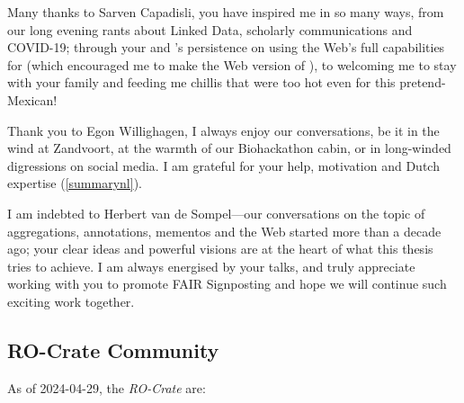 Many thanks to Sarven Capadisli, you have inspired me in so many ways, from our long evening rants about Linked Data, scholarly communications and COVID-19; through your and 's persistence on using the Web's full capabilities for   (which encouraged me to make the Web version of ), to welcoming me to stay with your family and feeding me chillis that were too hot even for this pretend-Mexican!

Thank you to Egon Willighagen, I always enjoy our conversations, be it in the wind at Zandvoort, at the warmth of our Biohackathon cabin, or in long-winded digressions on social media. I am grateful for your help, motivation and Dutch expertise (\vref{summarynl}).

I am indebted to Herbert van de Sompel---our conversations on the topic of aggregations, annotations, mementos and the Web started more than a decade ago; your clear ideas and powerful visions are at the heart of what this thesis tries to achieve. I am always energised by your talks, and truly appreciate working with you to promote FAIR Signposting and hope we will continue such exciting work together.


\subsection{RO-Crate Community}\label{communitylist}
\label{ro-crate-community}

As of 2024-04-29, the \emph{RO-Crate}  are:

